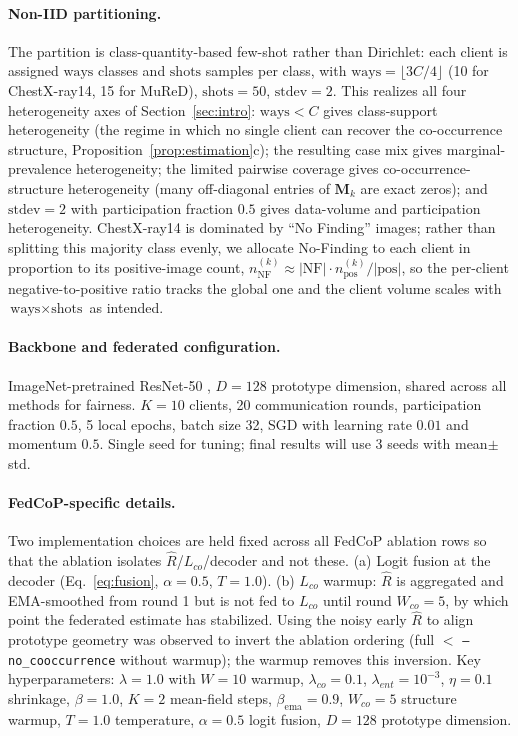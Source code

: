 \documentclass[11pt,a4paper]{article}
\theoremstyle{definition}
\newcommand{\Rhat}{\widehat{R}}
\begin{document}
\paragraph{Non-IID partitioning.} The partition is class-quantity-based few-shot rather than Dirichlet: each client is assigned $\text{ways}$ classes and $\text{shots}$ samples per class, with $\text{ways}=\lfloor 3C/4\rfloor$ (10 for ChestX-ray14, 15 for MuReD), $\text{shots}=50$, $\text{stdev}=2$. This realizes all four heterogeneity axes of Section~\ref{sec:intro}: $\text{ways}<C$ gives class-support heterogeneity (the regime in which no single client can recover the co-occurrence structure, Proposition~\ref{prop:estimation}c); the resulting case mix gives marginal-prevalence heterogeneity; the limited pairwise coverage gives co-occurrence-structure heterogeneity (many off-diagonal entries of $\mathbf{M}_k$ are exact zeros); and $\text{stdev}=2$ with participation fraction $0.5$ gives data-volume and participation heterogeneity. ChestX-ray14 is dominated by ``No Finding'' images; rather than splitting this majority class evenly, we allocate No-Finding to each client in proportion to its positive-image count, $n_{\text{NF}}^{(k)}\approx|\text{NF}|\cdot n_{\text{pos}}^{(k)}/|\text{pos}|$, so the per-client negative-to-positive ratio tracks the global one and the client volume scales with $\text{ways}\times\text{shots}$ as intended.

\paragraph{Backbone and federated configuration.} ImageNet-pretrained ResNet-50 \citep{he2016resnet}, $D=128$ prototype dimension, shared across all methods for fairness. $K=10$ clients, 20 communication rounds, participation fraction $0.5$, 5 local epochs, batch size 32, SGD with learning rate $0.01$ and momentum $0.5$. Single seed for tuning; final results will use 3 seeds with mean$\pm$std.

\paragraph{FedCoP-specific details.} Two implementation choices are held fixed across all FedCoP ablation rows so that the ablation isolates $\Rhat$/$L_{co}$/decoder and not these. (a) Logit fusion at the decoder (Eq.~\eqref{eq:fusion}, $\alpha=0.5$, $T=1.0$). (b) $L_{co}$ warmup: $\Rhat$ is aggregated and EMA-smoothed from round 1 but is not fed to $L_{co}$ until round $W_{co}=5$, by which point the federated estimate has stabilized. Using the noisy early $\Rhat$ to align prototype geometry was observed to invert the ablation ordering (full $<$ \texttt{--no\_cooccurrence} without warmup); the warmup removes this inversion. Key hyperparameters: $\lambda=1.0$ with $W=10$ warmup, $\lambda_{co}=0.1$, $\lambda_{ent}=10^{-3}$, $\eta=0.1$ shrinkage, $\beta=1.0$, $K=2$ mean-field steps, $\beta_{\text{ema}}=0.9$, $W_{co}=5$ structure warmup, $T=1.0$ temperature, $\alpha=0.5$ logit fusion, $D=128$ prototype dimension.
\end{document}
